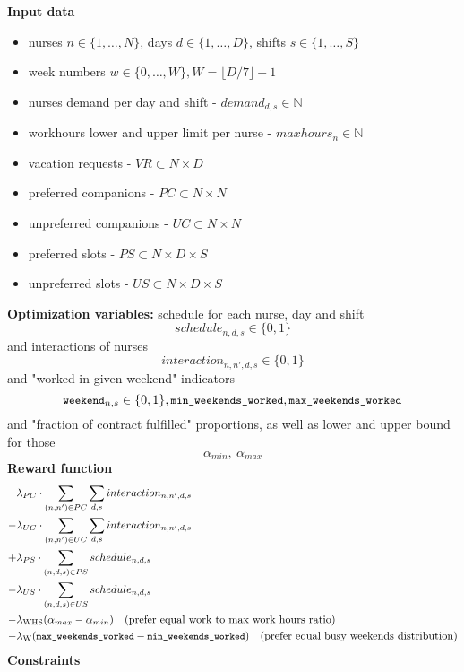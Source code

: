 \documentclass{article}
\newcommand{\N}{\mathbb{N}}
\newcommand{\varWeekendWorkedIndicator}[2]{\texttt{\small weekend}_{#1, #2}}
\newcommand{\varMinWeekendsWorked}{\texttt{\small min\_weekends\_worked}}
\newcommand{\varMaxWeekendsWorked}{\texttt{\small max\_weekends\_worked}}
\begin{document}
\noindent \textbf{Input data}
\begin{itemize}
    \item nurses $n\in \{1, \dots, N\}$, days $d\in \{1, \dots, D\}$, shifts $s\in \{1, \dots, S\}$
    \item week numbers $w\in\{0, \dots, W\}, W=\lfloor D/7 \rfloor - 1$
    \item nurses demand per day and shift - $demand_{d,s} \in \N$
    \item workhours lower and upper limit per nurse - $maxhours_n \in \N$
    \item vacation requests - $VR \subset N \times D$
    \item preferred companions - $PC \subset N \times N$
    \item unpreferred companions - $UC \subset N \times N$
    \item preferred slots - $PS \subset N \times D \times S$
    \item unpreferred slots - $US \subset N \times D \times S$
\end{itemize}
\textbf{Optimization variables:} schedule for each nurse, day and shift 
$$schedule_{n,d,s} \in \{0,1\}$$
and interactions of nurses \quad {}
$$interaction_{n,n',d,s} \in \{0,1\}$$
and "worked in given weekend" indicators
$$\varWeekendWorkedIndicator{n}{s} \in \{0, 1\}, \varMinWeekendsWorked, \varMaxWeekendsWorked$$
and "fraction of contract fulfilled" proportions, as well as lower and upper bound for those
$$\alpha_{min},\ \alpha_{max}$$
\textbf{Reward function}
\begin{align*}
     &\lambda_{PC}\cdot\sum_{(n, n')\in PC}\sum_{d,s} interaction_{n,n',d,s} \\
    -&\lambda_{UC}\cdot\sum_{(n, n')\in UC}\sum_{d,s} interaction_{n,n',d,s} \\ 
    +&\lambda_{PS}\cdot\sum_{(n, d, s)\in PS} schedule_{n,d,s} \\ 
    -&\lambda_{US}\cdot\sum_{(n, d, s)\in US} schedule_{n,d,s} \\
    -&\lambda_\text{WHS} (\alpha_{max} - \alpha_{min})\quad \text{(prefer equal work to max work hours ratio)} \\
    -&\lambda_\text{W} (\varMaxWeekendsWorked - \varMinWeekendsWorked)\quad \text{(prefer equal busy weekends distribution)}
\end{align*}
\textbf{Constraints}
\end{document}
